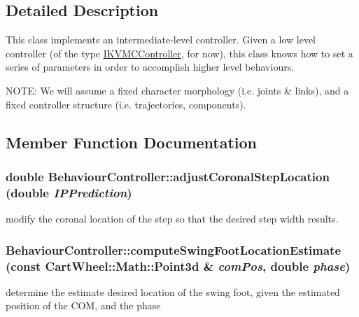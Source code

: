 \subsection{Detailed Description}
This class implements an intermediate-\/level controller. Given a low level controller (of the type \hyperlink{classCartWheel_1_1Core_1_1IKVMCController}{IKVMCController}, for now), this class knows how to set a series of parameters in order to accomplish higher level behaviours.

NOTE: We will assume a fixed character morphology (i.e. joints \& links), and a fixed controller structure (i.e. trajectories, components). 

\subsection{Member Function Documentation}
\hypertarget{classCartWheel_1_1Core_1_1BehaviourController_ad7a2bc712fb9d9ef3c1a367461f8c696}{
\subsubsection[{adjustCoronalStepLocation}]{\setlength{\rightskip}{0pt plus 5cm}double BehaviourController::adjustCoronalStepLocation (double {\em IPPrediction})}}
\label{classCartWheel_1_1Core_1_1BehaviourController_ad7a2bc712fb9d9ef3c1a367461f8c696}
modify the coronal location of the step so that the desired step width results. \hypertarget{classCartWheel_1_1Core_1_1BehaviourController_a4586a96ada87681f596ab6bd67af4144}{
\subsubsection[{computeSwingFootLocationEstimate}]{ BehaviourController::computeSwingFootLocationEstimate (const {\bf CartWheel::Math::Point3d} \& {\em comPos}, \/  double {\em phase})}}
\label{classCartWheel_1_1Core_1_1BehaviourController_a4586a96ada87681f596ab6bd67af4144}
determine the estimate desired location of the swing foot, given the estimated position of the COM, and the phase

